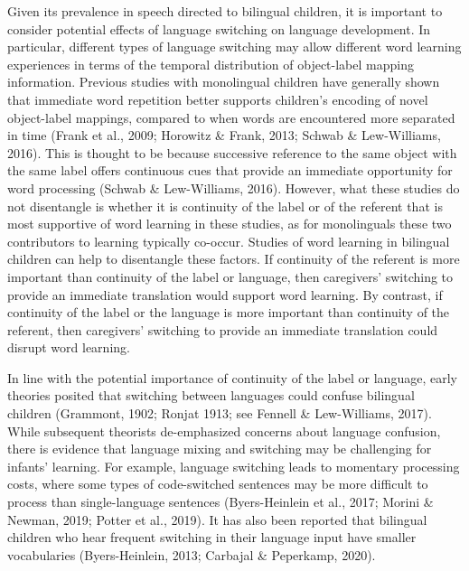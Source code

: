 \documentclass[
  man,floatsintext]{apa7}
\begin{document}
Given its prevalence in speech directed to bilingual children, it is important to consider potential effects of language switching on language development. In particular, different types of language switching may allow different word learning experiences in terms of the temporal distribution of object-label mapping information. Previous studies with monolingual children have generally shown that immediate word repetition better supports children's encoding of novel object-label mappings, compared to when words are encountered more separated in time (Frank et al., 2009; Horowitz \& Frank, 2013; Schwab \& Lew-Williams, 2016). This is thought to be because successive reference to the same object with the same label offers continuous cues that provide an immediate opportunity for word processing (Schwab \& Lew-Williams, 2016). However, what these studies do not disentangle is whether it is continuity of the label or of the referent that is most supportive of word learning in these studies, as for monolinguals these two contributors to learning typically co-occur. Studies of word learning in bilingual children can help to disentangle these factors. If continuity of the referent is more important than continuity of the label or language, then caregivers' switching to provide an immediate translation would support word learning. By contrast, if continuity of the label or the language is more important than continuity of the referent, then caregivers' switching to provide an immediate translation could disrupt word learning.

In line with the potential importance of continuity of the label or language, early theories posited that switching between languages could confuse bilingual children (Grammont, 1902; Ronjat 1913; see Fennell \& Lew-Williams, 2017). While subsequent theorists de-emphasized concerns about language confusion, there is evidence that language mixing and switching may be challenging for infants' learning. For example, language switching leads to momentary processing costs, where some types of code-switched sentences may be more difficult to process than single-language sentences (Byers-Heinlein et al., 2017; Morini \& Newman, 2019; Potter et al., 2019). It has also been reported that bilingual children who hear frequent switching in their language input have smaller vocabularies (Byers-Heinlein, 2013; Carbajal \& Peperkamp, 2020).
\end{document}
